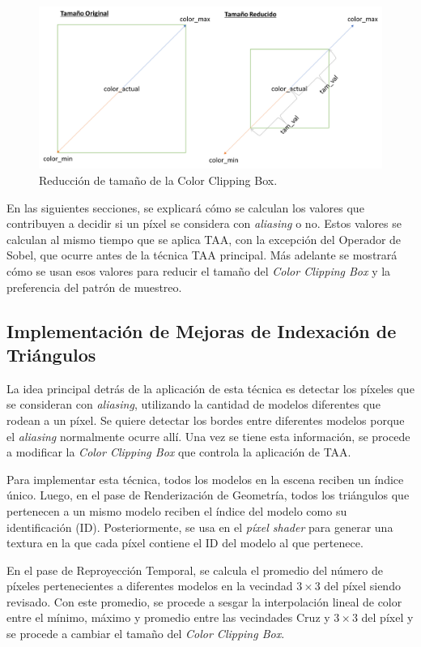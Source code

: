 \documentclass[pregrado]{tesis-usb} %
\begin{document}
\begin{figure}[!hbt]
	\centering
	\includegraphics[scale=0.3]{images/clipping_box_reduction.png}
	\caption{Reducción de tamaño de la Color Clipping Box.}\label{fig:colorclippingboxredux}
\end{figure}

En las siguientes secciones, se explicará cómo se calculan los valores que contribuyen a decidir si un píxel se considera con \textit{aliasing} o no. Estos valores se calculan al mismo tiempo que se aplica TAA, con la excepción del Operador de Sobel, que ocurre antes de la técnica TAA principal. Más adelante se mostrará cómo se usan esos valores para reducir el tamaño del \textit{Color Clipping Box} y la preferencia del patrón de muestreo.

\subsection{Implementación de Mejoras de Indexación de Triángulos}
La idea principal detrás de la aplicación de esta técnica es detectar los píxeles que se consideran con \textit{aliasing}, utilizando la cantidad de modelos diferentes que rodean a un píxel. Se quiere detectar los bordes entre diferentes modelos porque el \textit{aliasing} normalmente ocurre allí. Una vez se tiene esta información, se procede a modificar la \textit{Color Clipping Box} que controla la aplicación de TAA.

Para implementar esta técnica, todos los modelos en la escena reciben un índice único. Luego, en el pase de Renderización de Geometría, todos los triángulos que pertenecen a un mismo modelo reciben el índice del modelo como su identificación (ID). Posteriormente, se usa en el \textit{píxel shader} para generar una textura en la que cada píxel contiene el ID del modelo al que pertenece.

En el pase de Reproyección Temporal, se calcula el promedio del número de píxeles pertenecientes a diferentes modelos en la vecindad $3\times 3$ del píxel siendo revisado. Con este promedio, se procede a sesgar la interpolación lineal de color entre el mínimo, máximo y promedio entre las vecindades Cruz y $3\times 3$ del píxel y se procede a cambiar el tamaño del \textit{Color Clipping Box}.
\end{document}
